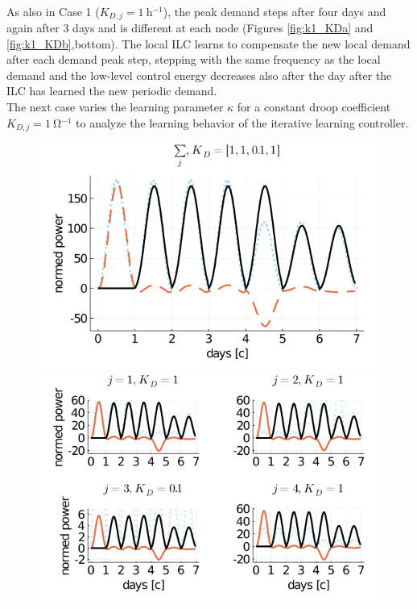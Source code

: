 \\As also in Case 1 ($K_{D,j} = \SI{1}{\hour^{-1}}$), the peak demand steps after four days and again after 3 days and is different at each node (Figures \ref{fig:k1_KDa} and \ref{fig:k1_KDb},bottom). The local ILC learns to compensate the new local demand after each demand peak step, stepping with the same frequency as the local demand and the low-level control energy decreases also after the day after the ILC has learned the new periodic demand. 
\\The next case varies the learning parameter $\kappa$ for a constant droop coefficient $K_{D,j}= \SI{1}{\ohm^{-1}}$ to analyze the learning behavior of the iterative learning controller.
\begin{figure}[h]
	\centering
	\includegraphics[scale=0.55]{pictures/plots/manual_calc_variation_kappa/kappa_1/K_variance/KDb/DC_prosumer_demand_seconds_sum_hetero.png}
	
	\bigbreak
	\includegraphics[scale=0.55]{pictures/plots/manual_calc_variation_kappa/kappa_1/K_variance/KDb/DC_prosumer_demand_seconds_nodes_hetero.png}
	

\end{figure}
